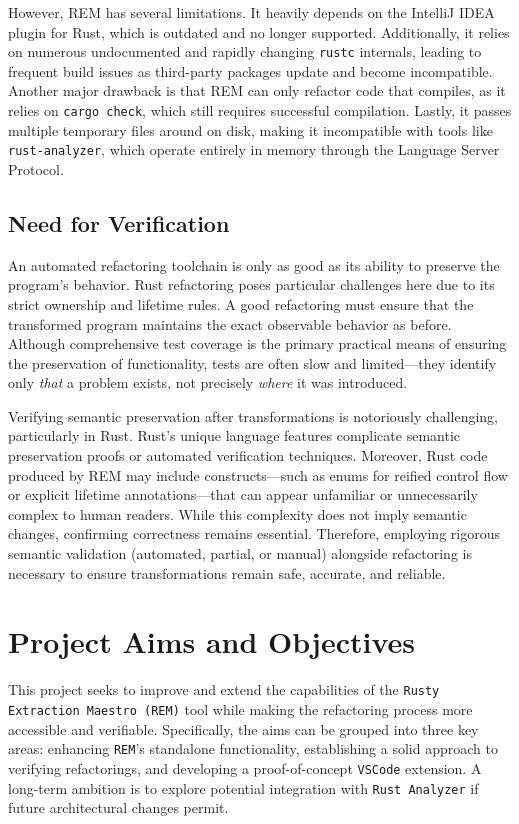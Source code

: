 However, REM has several limitations. It heavily depends on the IntelliJ IDEA
plugin for Rust, which is outdated and no longer supported. Additionally, it
relies on numerous undocumented and rapidly changing \texttt{rustc} internals,
leading to frequent build issues as third-party packages update and become
incompatible. Another major drawback is that REM can only refactor code that
compiles, as it relies on \texttt{cargo check}, which still requires successful
compilation. Lastly, it passes multiple temporary files around on disk, making
it incompatible with tools like \texttt{rust-analyzer}, which operate entirely
in memory through the Language Server Protocol.

\subsection{Need for Verification}
\label{sec:need-verification}

An automated refactoring toolchain is only as good as its ability to preserve
the program's behavior. Rust refactoring poses particular challenges here due to
its strict ownership and lifetime rules. A good refactoring must ensure that the
transformed program maintains the exact observable behavior as before. Although
comprehensive test coverage is the primary practical means of ensuring the
preservation of functionality, tests are often slow and limited—they identify
only \textit{that} a problem exists, not precisely \textit{where} it was
introduced.

Verifying semantic preservation after transformations is notoriously
challenging, particularly in Rust. Rust's unique language features complicate
semantic preservation proofs or automated verification techniques. Moreover,
Rust code produced by REM may include constructs—such as enums for reified
control flow or explicit lifetime annotations—that can appear unfamiliar or
unnecessarily complex to human readers. While this complexity does not imply
semantic changes, confirming correctness remains essential. Therefore, employing
rigorous semantic validation (automated, partial, or manual) alongside
refactoring is necessary to ensure transformations remain safe, accurate, and
reliable.

\section{Project Aims and Objectives}
\label{sec:project-aims}

This project seeks to improve and extend the capabilities of the \texttt{Rusty
Extraction Maestro (REM)} tool while making the refactoring process more
accessible and verifiable. Specifically, the aims can be grouped into three key
areas: enhancing \texttt{REM}'s standalone functionality, establishing a solid
approach to verifying refactorings, and developing a proof-of-concept
\texttt{VSCode} extension. A long-term ambition is to explore potential
integration with \texttt{Rust Analyzer} if future architectural changes permit.

